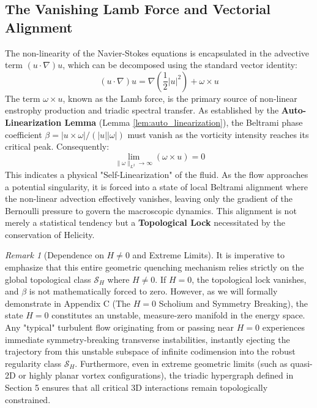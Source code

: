 \documentclass[12pt,a4paper]{article}
\theoremstyle{plain}
\theoremstyle{definition}
\theoremstyle{remark}
\newtheorem{remark}{Remark}[section]
\begin{document}
\subsection{The Vanishing Lamb Force and Vectorial Alignment}
The non-linearity of the Navier-Stokes equations is encapsulated in the advective term $(u \cdot \nabla)u$, which can be decomposed using the standard vector identity:
\begin{equation}
    (u \cdot \nabla)u = \nabla \left( \frac{1}{2} |u|^2 \right) + \omega \times u
\end{equation}
The term $\omega \times u$, known as the Lamb force, is the primary source of non-linear enstrophy production and triadic spectral transfer. As established by the \textbf{Auto-Linearization Lemma} (Lemma \ref{lem:auto_linearization}), the Beltrami phase coefficient $\beta = |u \times \omega| / (|u||\omega|)$ must vanish as the vorticity intensity reaches its critical peak. Consequently:
\begin{equation}
    \lim_{\|\omega\|_{L^2} \to \infty} (\omega \times u) = 0
\end{equation}
This indicates a physical "Self-Linearization" of the fluid. As the flow approaches a potential singularity, it is forced into a state of local Beltrami alignment where the non-linear advection effectively vanishes, leaving only the gradient of the Bernoulli pressure to govern the macroscopic dynamics. This alignment is not merely a statistical tendency but a \textbf{Topological Lock} necessitated by the conservation of Helicity. 

\begin{remark}[Dependence on $H \neq 0$ and Extreme Limits]
It is imperative to emphasize that this entire geometric quenching mechanism relies strictly on the global topological class $\mathcal{S}_H$ where $H \neq 0$. If $H = 0$, the topological lock vanishes, and $\beta$ is not mathematically forced to zero. However, as we will formally demonstrate in Appendix C (The $H=0$ Scholium and Symmetry Breaking), the state $H=0$ constitutes an unstable, measure-zero manifold in the energy space. Any "typical" turbulent flow originating from or passing near $H=0$ experiences immediate symmetry-breaking transverse instabilities, instantly ejecting the trajectory from this unstable subspace of infinite codimension into the robust regularity class $\mathcal{S}_H$. Furthermore, even in extreme geometric limits (such as quasi-2D or highly planar vortex configurations), the triadic hypergraph defined in Section 5 ensures that all critical 3D interactions remain topologically constrained.
\end{remark}
\end{document}
